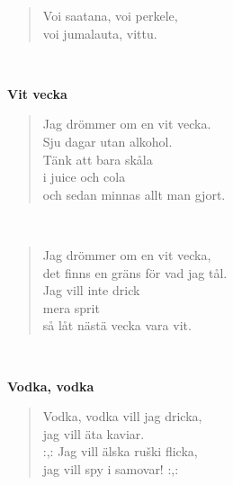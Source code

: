 \noindent\begin{minipage}{\linewidth}
\begin{verse}
	Voi saatana, voi perkele,\\
	voi jumalauta, vittu.\\
\end{verse}
\end{minipage}\\[10pt]
%
%
\noindent\begin{minipage}{\linewidth}
\vspace{5pt}
\parbox[t]{0.85\linewidth}{\raggedright {\large\bf Vit vecka}\\[6pt]}
\begin{verse}
	Jag drömmer om en vit vecka.\\
	Sju dagar utan alkohol.\\
	Tänk att bara skåla\\
	i juice och cola\\
	och sedan minnas allt man gjort.\\
\end{verse}
\end{minipage}\\[10pt]
\noindent\begin{minipage}{\linewidth}
\begin{verse}
	Jag drömmer om en vit vecka,\\
	det finns en gräns för vad jag tål.\\
	Jag vill inte drick\\
	mera sprit\\
	så låt nästä vecka vara vit.\\
\end{verse}
\end{minipage}\\[10pt]
%
%
\noindent\begin{minipage}{\linewidth}
\vspace{5pt}
\parbox[t]{0.85\linewidth}{\raggedright {\large\bf Vodka, vodka}\\[6pt]}
\begin{verse}
	Vodka, vodka vill jag dricka,\\
	jag vill äta kaviar.\\
	\hspace{0pt-\widthof{:,: }}:,: Jag vill älska ruški flicka,\\
	jag vill spy i samovar! :,:\\
\end{verse}
\end{minipage}\\[10pt]
